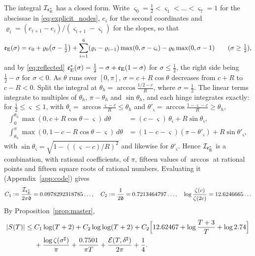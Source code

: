 \documentclass[11pt,a4paper]{article}
\makeatletter
\numberwithin{equation}{section}
\DeclareRobustCommand{\CGref}[1]{\ref{#1}}
\DeclareRobustCommand{\CGeqref}[1]{\eqref{#1}}
\let\CG@origref\ref
\let\CG@origeqref\eqref
\newcommand{\CG@gettip}[1]{\@ifundefined{CGTip@#1}{#1}{\csname CGTip@#1\endcsname}}
\DeclareRobustCommand{\CGref}[1]{\pdftooltip{\CG@origref{#1}}{\CG@gettip{#1}}}
\DeclareRobustCommand{\CGeqref}[1]{\pdftooltip{\CG@origeqref{#1}}{\CG@gettip{#1}}}
\theoremstyle{definition}
\theoremstyle{remark}
\newcommand{\eE}{\mathfrak e_{\rm E}}
\makeatother
\begin{document}
The integral $\mathcal I_{\eE^*}$ has a closed form. Write $\varsigma_0=\frac12<\varsigma_1<\dots<\varsigma_7=1$ for the abscissae in \CGeqref{eq:explicit_nodes}, $e_i$ for the second coordinates and $\varrho_i=(e_{i+1}-e_i)/(\varsigma_{i+1}-\varsigma_i)$ for the slopes, so that
\begin{equation}
\eE(\sigma)=e_0+\varrho_0\bigl(\sigma-\tfrac12\bigr)+\sum_{i=1}^{6}(\varrho_i-\varrho_{i-1})\max(0,\sigma-\varsigma_i)-\varrho_6\max(0,\sigma-1)\qquad(\sigma\ge\tfrac12),
\label{eq:disp_18}
\end{equation}
and by \CGeqref{eq:reflected} $\eE^*(\sigma)=\frac12-\sigma+\eE(1-\sigma)$ for $\sigma\le\frac12$, the right side being $\frac12-\sigma$ for $\sigma<0$. As $\theta$ runs over $[0,\pi]$, $\sigma=c+R\cos\theta$ decreases from $c+R$ to $c-R<0$. Split the integral at $\theta_h=\arccos\frac{1/2-c}R$, where $\sigma=\frac12$. The linear terms integrate to multiples of $\theta_h$, $\pi-\theta_h$ and $\sin\theta_h$, and each hinge integrates exactly: for $\frac12\le\varsigma\le1$, with $\theta_\varsigma=\arccos\frac{\varsigma-c}R\le\theta_h$ and $\theta'_\varsigma=\arccos\frac{1-\varsigma-c}R\ge\theta_h$,
\begin{equation}
\begin{aligned}
\int_0^{\theta_h}\max(0,c+R\cos\theta-\varsigma)\,d\theta&=(c-\varsigma)\,\theta_\varsigma+R\sin\theta_\varsigma,\\
\int_{\theta_h}^{\pi}\max(0,1-c-R\cos\theta-\varsigma)\,d\theta&=(1-c-\varsigma)(\pi-\theta'_\varsigma)+R\sin\theta'_\varsigma,
\end{aligned}
\label{eq:hinge_integrals}
\end{equation}
with $\sin\theta_\varsigma=\sqrt{1-((\varsigma-c)/R)^2}$ and likewise for $\theta'_\varsigma$. Hence $\mathcal I_{\eE^*}$ is a combination, with rational coefficients, of $\pi$, fifteen values of $\arccos$ at rational points and fifteen square roots of rational numbers. Evaluating it (Appendix~\CGref{app:code}) gives
\begin{equation}
C_1:=\frac{\mathcal I_{\eE^*}}{2\pi\mathfrak d}=0.0978292318785\ldots,\quad C_2:=\frac1{2\mathfrak d}=0.7213464797\ldots,\quad \log\frac{\zeta(c)}{\zeta(2c)}=12.6246665\ldots
\label{eq:C1_value}
\end{equation}
By Proposition~\CGref{prop:master},
\begin{equation}
\begin{split}
|S(T)|\le{}&C_1\log(T+2)+C_2\log\log(T+2)+C_2\Bigl[12.62467+\log\frac{T+3}T+\log2.74\Bigr]\\
&+\frac{\log\zeta(\sigma^\sharp)}\pi+\frac{0.7501}{\pi T}+\frac{\mathcal E(T,\delta^\sharp)}{2\pi}+\frac14 .
\end{split}
\label{eq:explicit_assembled}
\end{equation}
\end{document}
